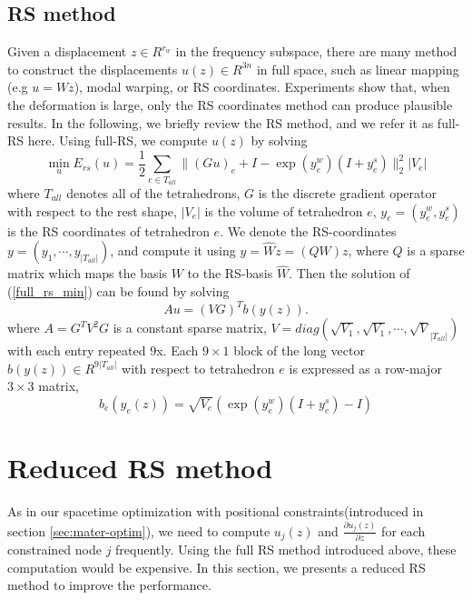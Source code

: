 \documentclass[9pt,twocolumn]{extarticle}
\begin{document}
\subsection{RS method}
Given a displacement $z\in R^{r_w}$ in the frequency subspace, there are many
method to construct the displacements $u(z)\in R^{3n}$ in full space, such as
linear mapping (e.g $u = Wz$), modal warping, or RS coordinates. Experiments
show that, when the deformation is large, only the RS coordinates method can
produce plausible results. In the following, we briefly review the RS method,
and we refer it as full-RS here. Using full-RS, we compute $u(z)$ by solving
\begin{equation}\label{full_rs_min}
  \min_{u} E_{rs}(u)=\frac{1}{2}\sum_{e\in T_{all}}\|(Gu)_e + I - \exp({y_e^w})(I+y_e^s)\|_2^2|V_e|
\end{equation}
where $T_{all}$ denotes all of the tetrahedrons, $G$ is the discrete gradient
operator with respect to the rest shape, $|V_e|$ is the volume of tetrahedron
$e$, $y_e=(y_e^w,y_e^s)$ is the RS coordinates of tetrahedron $e$. We denote the
RS-coordinates $y=(y_1,\cdots,y_{|T_{all}|})$, and compute it using
$y=\hat{W}z=(QW)z$, where $Q$ is a sparse matrix which maps the basis $W$ to the
RS-basis $\hat{W}$. Then the solution of (\ref{full_rs_min}) can be found by
solving
\begin{equation} \label{rs}
  Au = (VG)^Tb(y(z)).
\end{equation}
where $A=G^TV^2G$ is a constant sparse matrix,
$V=diag(\sqrt{V_1},\sqrt{V_1},\cdots,\sqrt{V}_{|T_{all}|})$ with each entry
repeated $9$x. Each $9\times1$ block of the long vector $b(y(z))\in
R^{9|T_{all}|}$ with respect to tetrahedron $e$ is expressed as a row-major
$3\times 3$ matrix,
\begin{equation}
  b_e(y_e(z)) = \sqrt{V_e}(\exp({y_e^w})(I+y_e^s)-I)
\end{equation}

\section{Reduced RS method}\label{sec:reduced-rs-method}
As in our spacetime optimization with positional constraints(introduced in
section \ref{sec:mater-optim}), we need to compute $u_j(z)$ and
$\frac{\partial{u_j(z)}}{\partial{z}}$ for each constrained node $j$
frequently. Using the full RS method introduced above, these computation would
be expensive. In this section, we presents a reduced RS method to improve the
performance.
\end{document}
